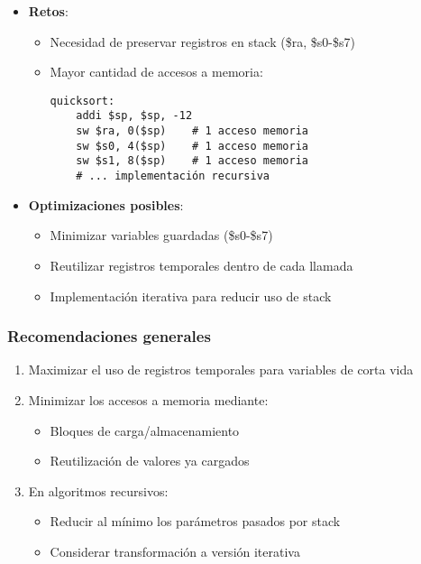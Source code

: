 \documentclass{article}
\begin{document}
\begin{itemize}
\item \textbf{Retos}:
\begin{itemize}
\item Necesidad de preservar registros en stack (\$ra, \$s0-\$s7)
\item Mayor cantidad de accesos a memoria:
\begin{verbatim}
quicksort:
    addi $sp, $sp, -12
    sw $ra, 0($sp)    # 1 acceso memoria
    sw $s0, 4($sp)    # 1 acceso memoria
    sw $s1, 8($sp)    # 1 acceso memoria
    # ... implementación recursiva
\end{verbatim}
\end{itemize}

\item \textbf{Optimizaciones posibles}:
\begin{itemize}
\item Minimizar variables guardadas (\$s0-\$s7)
\item Reutilizar registros temporales dentro de cada llamada
\item Implementación iterativa para reducir uso de stack
\end{itemize}
\end{itemize}

\subsubsection*{Recomendaciones generales}

\begin{enumerate}
\item Maximizar el uso de registros temporales para variables de corta vida
\item Minimizar los accesos a memoria mediante:
\begin{itemize}
\item Bloques de carga/almacenamiento
\item Reutilización de valores ya cargados
\end{itemize}
\item En algoritmos recursivos:
\begin{itemize}
\item Reducir al mínimo los parámetros pasados por stack
\item Considerar transformación a versión iterativa
\end{itemize}
\end{enumerate}

\end{document}
